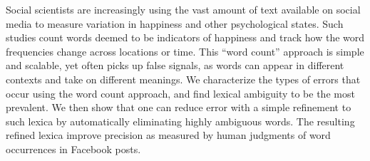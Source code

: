 Social scientists are increasingly using the vast amount of text available on social media to measure variation in happiness and other psychological states.
 Such studies count words deemed to be indicators of happiness and track how the
 word frequencies change across locations or time. This ``word count'' approach
 is simple and scalable, yet often picks up false signals, as words can appear
 in different contexts and take on different meanings. We characterize the types
 of errors that occur using the word count approach, and find lexical ambiguity
 to be the most prevalent. We then show that one can reduce error with a simple
 refinement to such lexica by automatically eliminating highly ambiguous words.
 The resulting refined lexica improve precision as measured by human judgments
 of word occurrences in Facebook posts.

